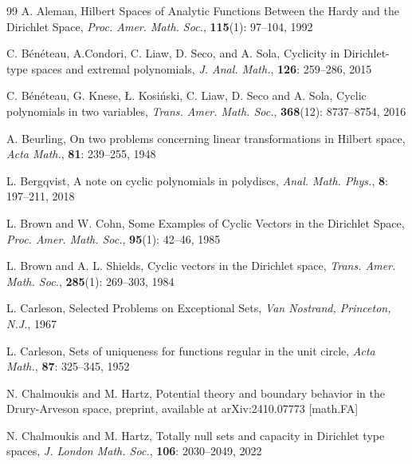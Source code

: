 \documentclass[12pt]{amsart}
\theoremstyle{definition}\newtheorem{remark}[theorem]{Remark}
\theoremstyle{definition}\newtheorem{example}[theorem]{Example}
\theoremstyle{definition}\newtheorem{definition}{Definition}
\numberwithin{equation}{section}
\begin{document}

\begin{thebibliography}{99}
 A. Aleman, Hilbert Spaces of Analytic Functions Between the Hardy and the Dirichlet Space, \emph{Proc. Amer. Math. Soc.}, \textbf{115}(1): 97--104, 1992


 C. B\'{e}n\'{e}teau, A.Condori, C. Liaw, D. Seco, and A. Sola, Cyclicity in Dirichlet-type spaces and extremal polynomials, \textit{J. Anal. Math.}, \textbf{126}: 259--286, 2015

 C. B\'{e}n\'{e}teau, G. Knese, \L. Kosi\'{n}ski, C. Liaw, D. Seco and A. Sola, Cyclic polynomials in two variables, \textit{Trans. Amer. Math. Soc.}, \textbf{368}(12): 8737--8754, 2016


 A. Beurling, On two problems concerning linear transformations in Hilbert space, \textit{Acta Math.}, \textbf{81}: 239--255, 1948

L. Bergqvist, A note on cyclic polynomials in polydiscs, \textit{Anal. Math. Phys.}, \textbf{8}: 197--211, 2018

 L. Brown and W. Cohn, Some Examples of Cyclic Vectors in the Dirichlet Space, \textit{Proc. Amer. Math. Soc.}, \textbf{95}(1): 42--46, 1985 

 L. Brown and A. L. Shields, Cyclic vectors in the Dirichlet space, \textit{Trans. Amer. Math. Soc.}, \textbf{285}(1): 269--303, 1984

 L. Carleson, Selected Problems on Exceptional Sets, \emph{Van Nostrand, Princeton, N.J.}, 1967

 L. Carleson, Sets of uniqueness for functions regular in the unit circle,
\emph{Acta Math.}, \textbf{87}: 325--345, 1952

N. Chalmoukis and M. Hartz, Potential theory and boundary behavior in the Drury-Arveson space, preprint, available at arXiv:2410.07773 [math.FA]

N. Chalmoukis and M. Hartz, Totally null sets and capacity in Dirichlet type spaces, \emph{J. London Math. Soc.}, \textbf{106}: 2030--2049, 2022



\end{thebibliography}
\end{document}
